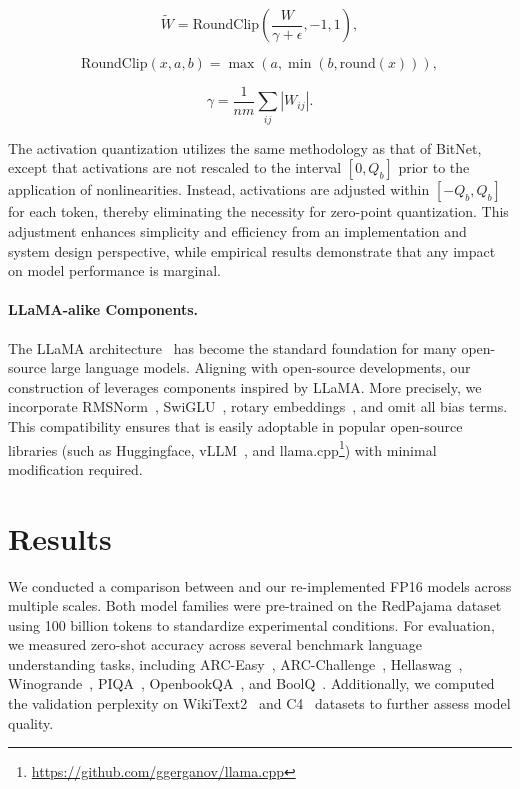 \begin{equation}
    \widetilde{W} = \mathrm{RoundClip}(\frac{W}{\gamma + \epsilon}, -1, 1),
\end{equation}

\begin{equation}
    \mathrm{RoundClip}(x, a, b) = \max(a, \min(b, \mathrm{round}(x))),
\end{equation}

\begin{equation}
    \gamma = \frac{1}{nm}\sum_{ij} |W_{ij}|.
\end{equation}

The activation quantization utilizes the same methodology as that of BitNet, except that activations are not rescaled to the interval $[0, Q_b]$ prior to the application of nonlinearities. Instead, activations are adjusted within $[-Q_b, Q_b]$ for each token, thereby eliminating the necessity for zero-point quantization. This adjustment enhances simplicity and efficiency from an implementation and system design perspective, while empirical results demonstrate that any impact on model performance is marginal.

\paragraph{LLaMA-alike Components.}

The LLaMA architecture~\cite{llama, llama2} has become the standard foundation for many open-source large language models. Aligning with open-source developments, our construction of  leverages components inspired by LLaMA. More precisely, we incorporate RMSNorm~\cite{rmsnorm}, SwiGLU~\cite{swiglu}, rotary embeddings~\cite{rope}, and omit all bias terms. This compatibility ensures that  is easily adoptable in popular open-source libraries (such as Huggingface, vLLM~\cite{vllm}, and llama.cpp\footnote{\url{https://github.com/ggerganov/llama.cpp}}) with minimal modification required.

\section{Results}

We conducted a comparison between  and our re-implemented FP16  models across multiple scales. Both model families were pre-trained on the RedPajama dataset~\cite{redpajama} using 100 billion tokens to standardize experimental conditions. For evaluation, we measured zero-shot accuracy across several benchmark language understanding tasks, including ARC-Easy~\cite{arc}, ARC-Challenge~\cite{arc}, Hellaswag~\cite{hellaswag}, Winogrande~\cite{winoGrande}, PIQA~\cite{piqa}, OpenbookQA~\cite{openbookqa}, and BoolQ~\cite{boolq}. Additionally, we computed the validation perplexity on WikiText2~\cite{wikitext2} and C4~\cite{c4} datasets to further assess model quality.

